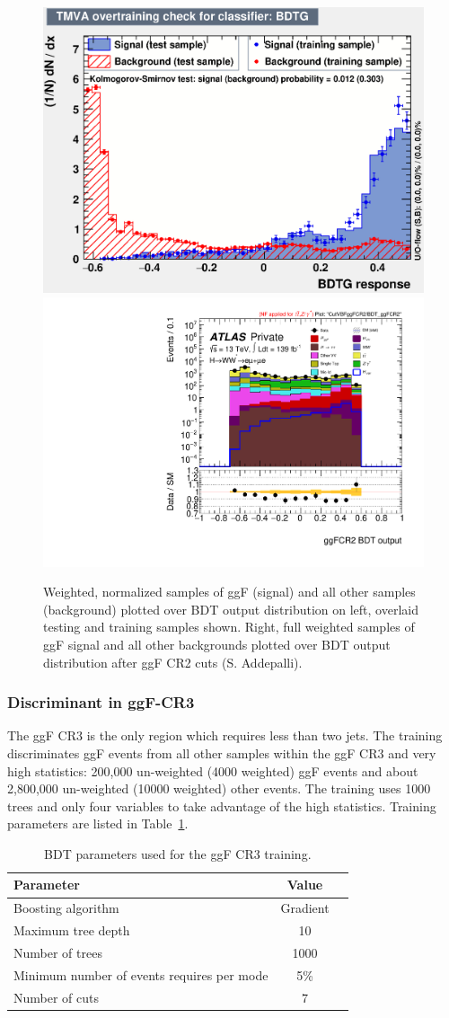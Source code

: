 \begin{figure}[!htbp]
\centering
  \includegraphics[width=.4\linewidth]{Pictures/ggFCR2/overtrain_BDTG.eps}
  \includegraphics[width=.45\linewidth]{Pictures/run2-emme-CutVBFggFCR2-BDT_ggFCR2-log.pdf}
\caption{Weighted, normalized samples of ggF (signal) and all other samples (background) plotted over BDT output distribution on left, overlaid testing and training samples shown. Right, full weighted samples of ggF signal and all other backgrounds plotted over BDT output distribution after ggF CR2 cuts (S. Addepalli).}
\label{fig:ggFCR2BDTresult}
\end{figure}

\subsubsection{Discriminant in ggF-CR3}
The ggF CR3 is the only region which requires less than two jets. The training discriminates ggF events from all other samples within the ggF CR3 and very high statistics: 200,000 un-weighted (4000 weighted) ggF events and about 2,800,000 un-weighted (10000 weighted) other events. The training uses 1000 trees and only four variables to take advantage of the high statistics. Training parameters are listed in Table~\ref{tab:ggFCR3BDTparameters}.

\begin{table}[h!]
\centering
\begin{tabular}{|l|c|c|}
\hline
Parameter                                    & Value     \\
\hline
Boosting algorithm                           & Gradient \\
Maximum tree depth                           &  10      \\
Number of trees                              &  1000    \\
Minimum number of events requires per mode   &  5\%     \\ 
Number of cuts                               &  7       \\
\hline
\end{tabular}
\caption{BDT parameters used for the ggF CR3 training.}
\label{tab:ggFCR3BDTparameters}
\end{table}

